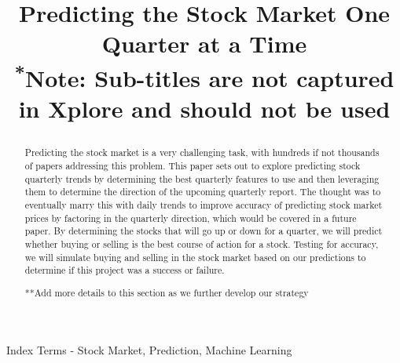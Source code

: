 \documentclass[conference]{IEEEtran}
\begin{document}
\title{Predicting the Stock Market One Quarter at a Time\\
{\footnotesize \textsuperscript{*}Note: Sub-titles are not captured in Xplore and
should not be used}

}

\author{
\and
{}
}

\maketitle



\begin{abstract}
Predicting the stock market is a very challenging task, with hundreds if not thousands of papers addressing this problem.  This paper sets out to explore predicting stock quarterly trends by determining the best quarterly features to use and then leveraging them to determine the direction of the upcoming quarterly report. The thought was to eventually marry this with daily trends to improve accuracy of predicting stock market prices by factoring in the quarterly direction, which would be covered in a future paper.  By determining the stocks that will go up or down for a quarter, we will predict whether buying or selling is the best course of action for a stock. Testing for accuracy, we will simulate buying and selling in the stock market based on our predictions to determine if this project was a success or failure.  

**Add more details to this section as we further develop our strategy
\end{abstract}

\begin{IEEEkeywords}
Index Terms - Stock Market, Prediction, Machine Learning
\end{IEEEkeywords}


\end{document}
